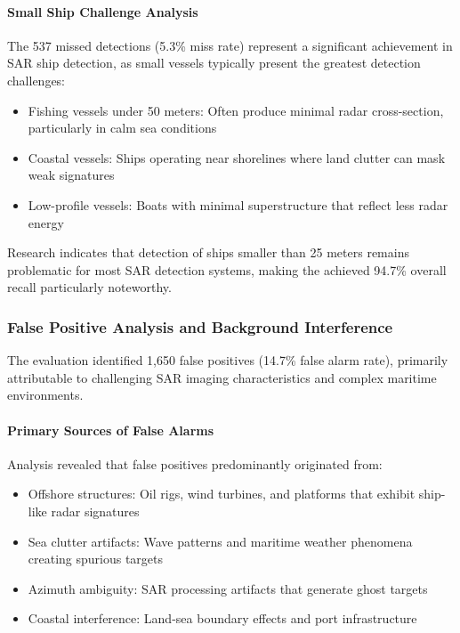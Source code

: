 \documentclass{article}
\begin{document}
	\paragraph{Small Ship Challenge Analysis}
	The 537 missed detections (5.3\% miss rate) represent a significant achievement in SAR ship detection, as small vessels typically present the greatest detection challenges:
	\begin{itemize}
		\item Fishing vessels under 50 meters: Often produce minimal radar cross-section, particularly in calm sea conditions
		\item Coastal vessels: Ships operating near shorelines where land clutter can mask weak signatures
		\item Low-profile vessels: Boats with minimal superstructure that reflect less radar energy
	\end{itemize}
	
	Research indicates that detection of ships smaller than 25 meters remains problematic for most SAR detection systems, making the achieved 94.7\% overall recall particularly noteworthy.
	
	\subsubsection{False Positive Analysis and Background Interference}
	The evaluation identified 1,650 false positives (14.7\% false alarm rate), primarily attributable to challenging SAR imaging characteristics and complex maritime environments.
	
	\paragraph{Primary Sources of False Alarms}
	Analysis revealed that false positives predominantly originated from:
	\begin{itemize}
		\item Offshore structures: Oil rigs, wind turbines, and platforms that exhibit ship-like radar signatures
		\item Sea clutter artifacts: Wave patterns and maritime weather phenomena creating spurious targets
		\item Azimuth ambiguity: SAR processing artifacts that generate ghost targets
		\item Coastal interference: Land-sea boundary effects and port infrastructure
	\end{itemize}
	
\end{document}
